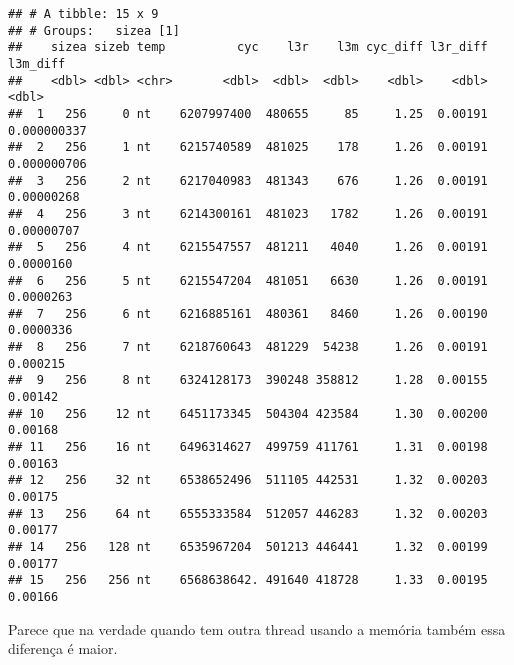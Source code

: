 \documentclass[
]{article}
\newenvironment{Shaded}{\begin{snugshade}}{\end{snugshade}}
\newcommand{\CommentTok}[1]{\textcolor[rgb]{0.56,0.35,0.01}{\textit{#1}}}
\newcommand{\DataTypeTok}[1]{\textcolor[rgb]{0.13,0.29,0.53}{#1}}
\newcommand{\DecValTok}[1]{\textcolor[rgb]{0.00,0.00,0.81}{#1}}
\newcommand{\KeywordTok}[1]{\textcolor[rgb]{0.13,0.29,0.53}{\textbf{#1}}}
\newcommand{\NormalTok}[1]{#1}
\newcommand{\OperatorTok}[1]{\textcolor[rgb]{0.81,0.36,0.00}{\textbf{#1}}}
\newcommand{\StringTok}[1]{\textcolor[rgb]{0.31,0.60,0.02}{#1}}
\begin{document}
\begin{verbatim}
## # A tibble: 15 x 9
## # Groups:   sizea [1]
##    sizea sizeb temp          cyc    l3r    l3m cyc_diff l3r_diff    l3m_diff
##    <dbl> <dbl> <chr>       <dbl>  <dbl>  <dbl>    <dbl>    <dbl>       <dbl>
##  1   256     0 nt    6207997400  480655     85     1.25  0.00191 0.000000337
##  2   256     1 nt    6215740589  481025    178     1.26  0.00191 0.000000706
##  3   256     2 nt    6217040983  481343    676     1.26  0.00191 0.00000268 
##  4   256     3 nt    6214300161  481023   1782     1.26  0.00191 0.00000707 
##  5   256     4 nt    6215547557  481211   4040     1.26  0.00191 0.0000160  
##  6   256     5 nt    6215547204  481051   6630     1.26  0.00191 0.0000263  
##  7   256     6 nt    6216885161  480361   8460     1.26  0.00190 0.0000336  
##  8   256     7 nt    6218760643  481229  54238     1.26  0.00191 0.000215   
##  9   256     8 nt    6324128173  390248 358812     1.28  0.00155 0.00142    
## 10   256    12 nt    6451173345  504304 423584     1.30  0.00200 0.00168    
## 11   256    16 nt    6496314627  499759 411761     1.31  0.00198 0.00163    
## 12   256    32 nt    6538652496  511105 442531     1.32  0.00203 0.00175    
## 13   256    64 nt    6555333584  512057 446283     1.32  0.00203 0.00177    
## 14   256   128 nt    6535967204  501213 446441     1.32  0.00199 0.00177    
## 15   256   256 nt    6568638642. 491640 418728     1.33  0.00195 0.00166
\end{verbatim}

Parece que na verdade quando tem outra thread usando a memória também
essa diferença é maior.

\begin{Shaded}
\end{Shaded}
\end{document}
